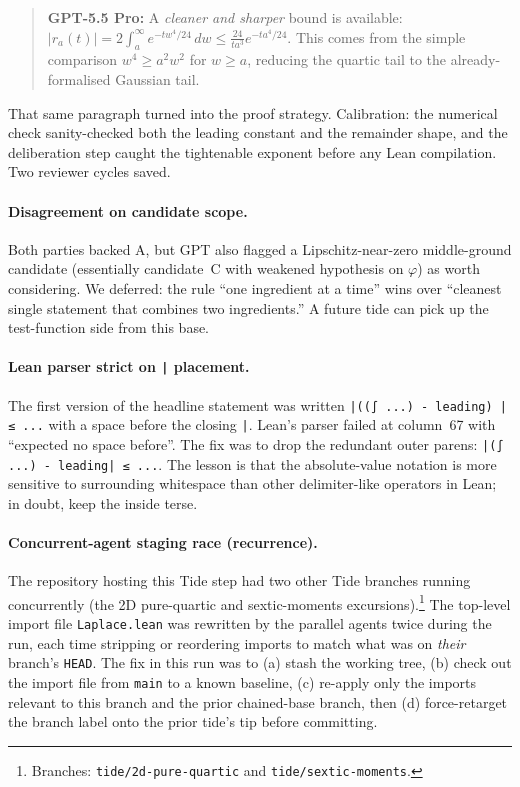 \documentclass[11pt]{article}
\newcommand{\gptbox}[1]{\par\medskip\begin{quote}\small\textbf{\textcolor{green!50!black}{GPT-5.5 Pro:}} #1\end{quote}\medskip}
\begin{document}
\gptbox{A \emph{cleaner and sharper} bound is available:
$|r_a(t)| = 2 \int_a^\infty e^{-t w^4 / 24}\,dw \le \frac{24}{t a^3} e^{-t a^4 / 24}$.
This comes from the simple comparison $w^4 \ge a^2 w^2$ for $w \ge a$,
reducing the quartic tail to the already-formalised Gaussian tail.}

That same paragraph turned into the proof strategy. Calibration: the
numerical check sanity-checked both the leading constant and the
remainder shape, and the deliberation step caught the tightenable
exponent before any Lean compilation. Two reviewer cycles saved.

\paragraph{Disagreement on candidate scope.}
Both parties backed A, but GPT also flagged a Lipschitz-near-zero
middle-ground candidate (essentially candidate~C with weakened
hypothesis on $\varphi$) as worth considering. We deferred: the rule
``one ingredient at a time'' wins over ``cleanest single statement that
combines two ingredients.'' A future tide can pick up the test-function
side from this base.

\paragraph{Lean parser strict on \texttt{|} placement.}
The first version of the headline statement was written
\verb!|((∫ ...) - leading) | ≤ ...! with a space before the closing
\verb!|!. Lean's parser failed at column~67 with ``expected no space
before''. The fix was to drop the redundant outer parens:
\verb!|(∫ ...) - leading| ≤ ...!. The lesson is that the absolute-value
notation is more sensitive to surrounding whitespace than other
delimiter-like operators in Lean; in doubt, keep the inside terse.

\paragraph{Concurrent-agent staging race (recurrence).}
The repository hosting this Tide step had two other Tide branches
running concurrently (the 2D pure-quartic and sextic-moments
excursions).\footnote{Branches: \texttt{tide/2d-pure-quartic} and
\texttt{tide/sextic-moments}.} The top-level import file
\texttt{Laplace.lean} was rewritten by the parallel agents twice during
the run, each time stripping or reordering imports to match what was on
\emph{their} branch's \texttt{HEAD}. The fix in this run was to
(a) stash the working tree, (b) check out the import file from
\texttt{main} to a known baseline, (c) re-apply only the imports
relevant to this branch and the prior chained-base branch, then
(d) force-retarget the branch label onto the prior tide's tip before
committing.
\end{document}
